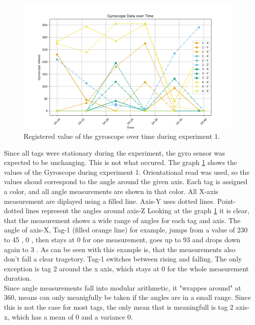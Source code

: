 \begin{figure}[ht!]
	\includegraphics[width=\linewidth]{graphics/exp/exp1_gyro_data_plot_0.png}
	\caption{Registered value of the gyroscope over time during experiment 1.}
	\label{f:exp1_graphs_gyro}
\end{figure}

Since all tags were stationary during the experiment, the gyro sensor was expected to be unchanging.
This is not what occured.
The graph \ref{f:exp1_graphs_gyro} shows the values of the Gyroscope during experiment 1.
Orientational read was used, so the values shoud correspond to the angle around the given axis.
Each tag is assigned a color, and all angle measurements are shown in that color.
All X-axis measurement are diplayed using a filled line.
Axis-Y uses dotted lines.
Point-dotted lines represent the angles around axis-Z
Looking at the graph \ref{f:exp1_graphs_gyro} it is clear, that the measurement shows a wide range of angles for each tag and axis.
The angle of axis-X, Tag-1 (filled orange line) for example, jumps from a value of 230 \degree to 45 \degree, 0 \degree, then stays at 0 \degree for one measurement, goes up to 93 \degree and drops down again to 3 \degree.
As can be seen with this example is, that the measurements also don't fall a clear tragetory.
Tag-1 switches between rising and falling.
The only exception is tag 2 around the x axis, which stays at 0 for the whole measurement duration.\\
Since angle measurements fall into modular arithmetic, it "wrappes around" at 360\degree , means can only meanigfully be taken if the angles are in a small range.
Since this is not the case for most tags, the only mean that is meaningfull is tag 2 axis-x, which has a mean of 0 and a variance 0.

